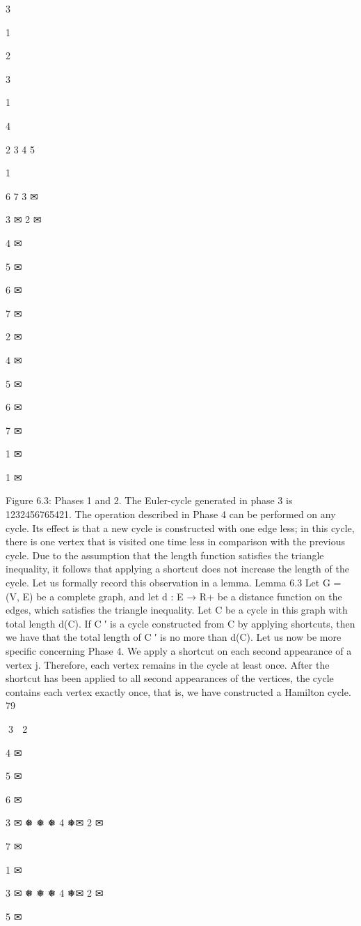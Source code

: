 \documentclass[titlepage]{book}
\theoremstyle{plain}
\theoremstyle{definition}
\theoremstyle{remark}
\begin{document}
3

1

2

3

1

4

2
3
4
5

1

6
7
3 ✉

3 ✉
2 ✉

4
✉

5
✉

6
✉

7
✉

2 ✉

4
✉

5
✉

6
✉

7
✉

1 ✉

1 ✉

Figure 6.3: Phases 1 and 2.
The Euler-cycle generated in phase 3 is 1232456765421.
The operation described in Phase 4 can be performed on any cycle. Its effect is that a new cycle is
constructed with one edge less; in this cycle, there is one vertex that is visited one time less in comparison
with the previous cycle. Due to the assumption that the length function satisfies the triangle inequality,
it follows that applying a shortcut does not increase the length of the cycle. Let us formally record this
observation in a lemma.
Lemma 6.3 Let G = (V, E) be a complete graph, and let d : E → R+ be a distance function on the
edges, which satisfies the triangle inequality. Let C be a cycle in this graph with total length d(C). If C ′
is a cycle constructed from C by applying shortcuts, then we have that the total length of C ′ is no more
than d(C).
Let us now be more specific concerning Phase 4. We apply a shortcut on each second appearance of a
vertex j. Therefore, each vertex remains in the cycle at least once. After the shortcut has been applied
to all second appearances of the vertices, the cycle contains each vertex exactly once, that is, we have
constructed a Hamilton cycle.
79

3 ✉
2 ✉

4
✉

5
✉

6
✉

3 ✉
❅
❅
❅ 4
❅✉
2 ✉

7
✉

1 ✉

3 ✉
❅
❅
❅ 4
❅✉
2 ✉

5
✉
\end{document}
